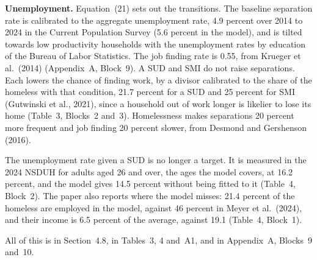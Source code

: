 \documentclass[11pt]{article}
\begin{document}
\begin{response}
\textbf{Unemployment.} Equation~(21) sets out the transitions. The baseline separation
rate is calibrated to the aggregate unemployment rate, 4.9 percent over 2014 to 2024
in the Current Population Survey (5.6 percent in the model), and is tilted towards low
productivity households with the unemployment rates by education of the Bureau of
Labor Statistics. The job finding rate is 0.55, from Krueger et al.\ (2014) (Appendix~A, Block~9). A SUD and SMI
do not raise separations. Each lowers the chance of finding work, by a divisor
calibrated to the share of the homeless with that condition, 21.7 percent for a SUD
and 25 percent for SMI (Gutwinski et al., 2021), since a household out of work longer
is likelier to lose its home (Table~3, Blocks~2 and~3). Homelessness makes separations
20 percent more frequent and job finding 20 percent slower, from Desmond and
Gershenson (2016).

The unemployment rate given a SUD is no longer a target. It is measured in the 2024
NSDUH for adults aged 26 and over, the ages the model covers, at 16.2 percent, and the
model gives 14.5 percent without being fitted to it (Table~4, Block~2). The paper
also reports where the model misses: 21.4 percent of the homeless are employed in the
model, against 46 percent in Meyer et al.\ (2024), and their income is 6.5 percent of
the average, against 19.1 (Table~4, Block~1).

All of this is in Section~4.8, in Tables~3, 4 and~A1, and in Appendix~A, Blocks~9
and~10.
\end{response}
\end{document}
